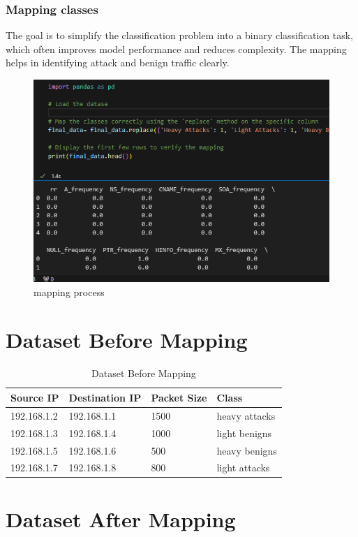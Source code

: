\subsubsection{Mapping classes}
The goal is to simplify the classification problem into a binary classification task, which often improves model performance and reduces complexity. The mapping helps in identifying attack and benign traffic clearly.


\begin{figure}[ht!]
    \centering
    \includegraphics[width=0.5\linewidth]{chap3/images/mapping.png}
    \caption{mapping process}
    \label{fig:enter-label}
\end{figure}

\newpage
\section*{Dataset Before Mapping}


\begin{table}[ht!]
\centering
\begin{tabular}{@{}llll@{}}
\toprule
Source IP   & Destination IP & Packet Size & Class         \\ \midrule
192.168.1.2 & 192.168.1.1    & 1500        & heavy attacks \\
192.168.1.3 & 192.168.1.4    & 1000        & light benigns \\
192.168.1.5 & 192.168.1.6    & 500         & heavy benigns \\
192.168.1.7 & 192.168.1.8    & 800         & light attacks \\ \bottomrule
\end{tabular}
\caption{Dataset Before Mapping}
\label{tab:before_mapping}
\end{table}

\section*{Dataset After Mapping}

